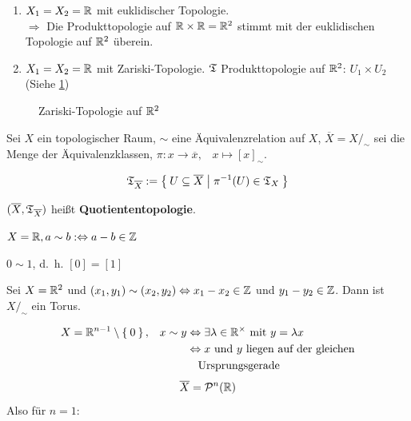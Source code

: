 \begin{beispiel}
    \begin{enumerate}[label=\arabic*)]
        \item $X_1 = X_2 = \mathbb{R}$ mit euklidischer Topologie.\\
              $\Rightarrow$ Die Produkttopologie auf $\mathbb{R} \times \mathbb{R} = \mathbb{R}^2$
              stimmt mit der euklidischen Topologie auf $\mathbb{R}^2$ überein.
        \item $X_1 = X_2 = \mathbb{R}$ mit Zariski-Topologie.
              $\mathfrak{T}$ Produkttopologie auf $\mathbb{R}^2$: $U_1 \times U_2$\\
              (Siehe \cref{fig:zariski-topologie})
    \end{enumerate}

    \begin{figure}[htp]
        \centering
        
        \caption{Zariski-Topologie auf $\mathbb{R}^2$}
        \label{fig:zariski-topologie}
    \end{figure}
\end{beispiel}

\begin{definition} 
    Sei $X$ ein topologischer Raum, $\sim$ eine Äquivalenzrelation auf $X$,
    $\overline{X} = X /_\sim$ sei die Menge der Äquivalenzklassen,
    $\pi: x \rightarrow \overline{x}, \;\;\; x \mapsto [x]_\sim$.

    \[\mathfrak{T}_{\overline{X}} := \Set{U \subseteq \overline{X} | \pi^{-1}(U) \in \mathfrak{T}_X}\]

    $(\overline{X}, \mathfrak{T}_{\overline{X}})$ heißt \textbf{Quotiententopologie}.
\end{definition}

\begin{beispiel}
    $X = \mathbb{R}, a \sim b :\Leftrightarrow a-b \in \mathbb{Z}$
    
    

    $0 \sim 1$, d.~h. $[0] = [1]$
\end{beispiel}

\begin{beispiel}
    Sei $X = \mathbb{R}^2$ und $(x_1, y_1) \sim (x_2, y_2) \Leftrightarrow x_1 - x_2 \in \mathbb{Z}$ 
    und $y_1 - y_2 \in \mathbb{Z}$. Dann ist $X /_\sim$ ein Torus.
\end{beispiel}

\begin{beispiel}
    \begin{align*}
        X= \mdr^{n-1} \setminus \Set{0},\;\;\; x \sim y &\gdw \exists \lambda \in \mdr^\times \text{ mit } y = \lambda x\\
            &\gdw x \text{ und } y \text{ liegen auf der gleichen}\\
            &\hphantom{\gdw} \text{Ursprungsgerade}
    \end{align*}
    \[\overline{X} = \mathcal{P}^n(\mathbb{R})\]
    Also für $n=1$:\nopagebreak\\
    
\end{beispiel}

